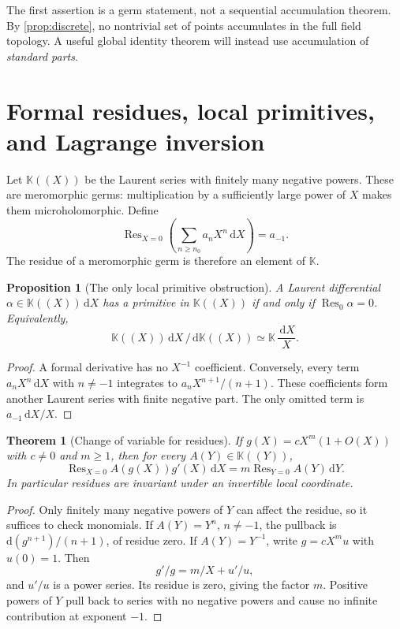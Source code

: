 \documentclass[11pt,letterpaper]{article}
\numberwithin{equation}{section}
\newtheorem{theorem}{Theorem}[section]
\newtheorem{proposition}[proposition]{Proposition}
\theoremstyle{definition}
\theoremstyle{remark}
\newcommand{\K}{\mathbb K}
\newcommand{\dd}{\,\mathrm d}
\DeclareMathOperator{\Res}{Res}
\begin{document}
The first assertion is a germ statement, not a sequential accumulation
theorem. By \cref{prop:discrete}, no nontrivial set of points accumulates
in the full field topology. A useful global identity theorem will instead
use accumulation of \emph{standard parts}.

\section{Formal residues, local primitives, and Lagrange inversion}
\label{sec:formalres}

Let $\K((X))$ be the Laurent series with finitely many negative powers.
These are meromorphic germs: multiplication by a sufficiently large
power of $X$ makes them microholomorphic. Define
\[
 \Res_{X=0}\left(\sum_{n\ge n_0}a_nX^n\dd X\right)=a_{-1}.
\]
The residue of a meromorphic germ is therefore an element of $\K$.

\begin{proposition}[The only local primitive obstruction]\label{prop:primitive}
A Laurent differential $\alpha\in\K((X))\dd X$ has a primitive in
$\K((X))$ if and only if $\Res_0\alpha=0$. Equivalently,
\[
 \K((X))\dd X\,/\,\mathrm d\K((X))\simeq\K\,\frac{\dd X}{X}.
\]
\end{proposition}
\begin{proof}
A formal derivative has no $X^{-1}$ coefficient. Conversely, every term
$a_nX^n\dd X$ with $n\ne-1$ integrates to
$a_nX^{n+1}/(n+1)$. These coefficients form another Laurent series with
finite negative part. The only omitted term is $a_{-1}\dd X/X$.
\end{proof}

\begin{theorem}[Change of variable for residues]\label{thm:reschange}
If $g(X)=cX^m(1+O(X))$ with $c\ne0$ and $m\ge1$, then for every
$A(Y)\in\K((Y))$,
\begin{equation}\label{eq:reschange}
 \Res_{X=0}A(g(X))g'(X)\dd X
 =m\Res_{Y=0}A(Y)\dd Y.
\end{equation}
In particular residues are invariant under an invertible local coordinate.
\end{theorem}
\begin{proof}
Only finitely many negative powers of $Y$ can affect the residue, so it
suffices to check monomials. If $A(Y)=Y^n$, $n\ne-1$, the pullback is
$\mathrm d(g^{n+1})/(n+1)$, of residue zero. If $A(Y)=Y^{-1}$, write
$g=cX^mu$ with $u(0)=1$. Then
\[
 g'/g=m/X+u'/u,
\]
and $u'/u$ is a power series. Its residue is zero, giving the factor $m$.
Positive powers of $Y$ pull back to series with no negative powers and
cause no infinite contribution at exponent $-1$.
\end{proof}
\end{document}
